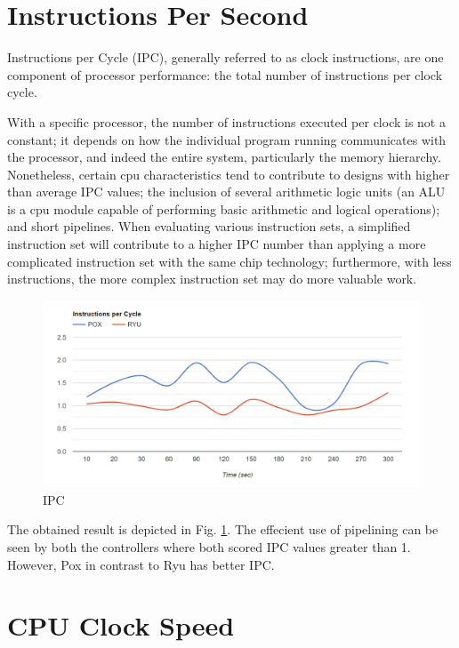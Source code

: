 \section{Instructions Per Second}

Instructions per Cycle (IPC), generally referred to as clock instructions, are one component of processor performance: the total number of instructions per clock cycle.

With a specific processor, the number of instructions executed per clock is not a constant; it depends on how the individual program running communicates with the processor, and indeed the entire system, particularly the memory hierarchy. Nonetheless, certain cpu characteristics tend to contribute to designs with higher than average IPC values; the inclusion of several arithmetic logic units (an ALU is a cpu module capable of performing basic arithmetic and logical operations); and short pipelines. When evaluating various instruction sets, a simplified instruction set will contribute to a higher IPC number than applying a more complicated instruction set with the same chip technology; furthermore, with less instructions, the more complex instruction set may do more valuable work. 

\begin{figure}[!hbt]
    \centering
        \includegraphics[width=\textwidth,keepaspectratio]{images/ipc.png}
       \caption{IPC}
        \label{ipc}
\end{figure}

The obtained result is depicted in Fig. \ref{ipc}. The effecient use of pipelining can be seen by both the controllers where both scored IPC values greater than 1. However, Pox in contrast to Ryu has better IPC.

\section{CPU Clock Speed}

